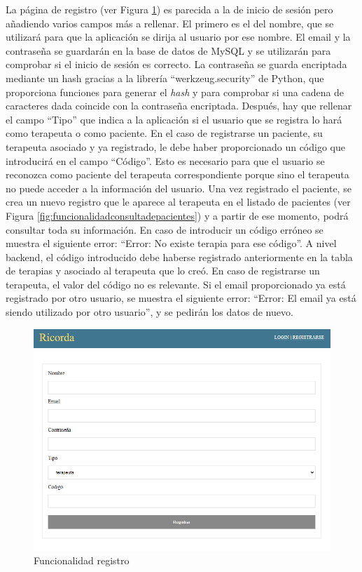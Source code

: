 La página de registro (ver Figura \ref{fig:funcionalidadsignin}) es parecida a la de inicio de sesión pero añadiendo varios campos más a rellenar. El primero es el del nombre, que se utilizará para que la aplicación se dirija al usuario por ese nombre. El email y la contraseña se guardarán en la base de datos de MySQL y se utilizarán para comprobar si el inicio de sesión es correcto. La contraseña se guarda encriptada mediante un hash gracias a la librería ``werkzeug.security'' de Python, que proporciona funciones para generar el \textit{hash} y para comprobar si una cadena de caracteres dada coincide con la contraseña encriptada. Después, hay que rellenar el campo ``Tipo'' que indica a la aplicación si el usuario que se registra lo hará como terapeuta o como paciente. En el caso de registrarse un paciente, su terapeuta asociado y ya registrado, le debe haber proporcionado un código que introducirá en el campo ``Código''. Esto es necesario para que el usuario se reconozca como paciente del terapeuta correspondiente porque sino el terapeuta no puede acceder a la información del usuario. Una vez registrado el paciente, se crea un nuevo registro que le aparece al terapeuta en el listado de pacientes (ver Figura \ref{fig:funcionalidadconsultadepacientes}) y a partir de ese momento, podrá consultar toda su información. En caso de introducir un código erróneo se muestra el siguiente error: ``Error: No existe terapia para ese código''. A nivel backend, el código introducido debe haberse registrado anteriormente en la tabla de terapias y asociado al terapeuta que lo creó. En caso de registrarse un terapeuta, el valor del código no es relevante. Si el email proporcionado ya está registrado por otro usuario, se muestra el siguiente error: ``Error: El email ya está siendo utilizado por otro usuario'', y se pedirán los datos de nuevo.

\begin{figure}[h]
	\centering
	\includegraphics[scale=0.6]{Imagenes/Vectorial/funcionalidad_signin1 }
	\caption{Funcionalidad registro}
	\label{fig:funcionalidadsignin}
\end{figure}

